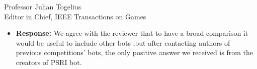 \documentclass[10pt]{letter} %
\begin{document}
\begin{letter}{Professor Julian Togelius \\ Editor in Chief, IEEE Transactions on Games}
\begin{enumerate}
\begin{itemize}
			\item {\bf Response:} 
		We agree with the reviewer that to have a broad comparison it would be useful to include other bots ,but after contacting authors of previous competitions' bots, the only positive answer we received is from the creators of PSRI bot.	
			
	\end{itemize}	

\end{enumerate}
 


\end{letter}
\end{document}
